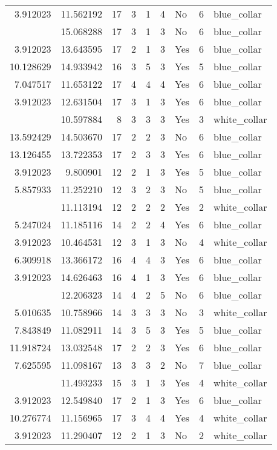 \documentclass[
]{article}
\begin{document}
\begin{longtable}[t]{rrrrrllrl}
3.912023 & 11.562192 & 17 & 3 & 1 & 4 & No & 6 & blue\_collar\\
\addlinespace
3.912023 & 15.068288 & 17 & 3 & 1 & 3 & No & 6 & blue\_collar\\
3.912023 & 13.643595 & 17 & 2 & 1 & 3 & Yes & 6 & blue\_collar\\
10.128629 & 14.933942 & 16 & 3 & 5 & 3 & Yes & 5 & blue\_collar\\
7.047517 & 11.653122 & 17 & 4 & 4 & 4 & Yes & 6 & blue\_collar\\
3.912023 & 12.631504 & 17 & 3 & 1 & 3 & Yes & 6 & blue\_collar\\
\addlinespace
4.605170 & 10.597884 & 8 & 3 & 3 & 3 & Yes & 3 & white\_collar\\
13.592429 & 14.503670 & 17 & 2 & 2 & 3 & No & 6 & blue\_collar\\
13.126455 & 13.722353 & 17 & 2 & 3 & 3 & Yes & 6 & blue\_collar\\
3.912023 & 9.800901 & 12 & 2 & 1 & 3 & Yes & 5 & blue\_collar\\
5.857933 & 11.252210 & 12 & 3 & 2 & 3 & No & 5 & blue\_collar\\
\addlinespace
8.022897 & 11.113194 & 12 & 2 & 2 & 2 & Yes & 2 & white\_collar\\
5.247024 & 11.185116 & 14 & 2 & 2 & 4 & Yes & 6 & blue\_collar\\
3.912023 & 10.464531 & 12 & 3 & 1 & 3 & No & 4 & white\_collar\\
6.309918 & 13.366172 & 16 & 4 & 4 & 3 & Yes & 6 & blue\_collar\\
3.912023 & 14.626463 & 16 & 4 & 1 & 3 & Yes & 6 & blue\_collar\\
\addlinespace
10.128629 & 12.206323 & 14 & 4 & 2 & 5 & No & 6 & blue\_collar\\
5.010635 & 10.758966 & 14 & 3 & 3 & 3 & No & 3 & white\_collar\\
7.843849 & 11.082911 & 14 & 3 & 5 & 3 & Yes & 5 & blue\_collar\\
11.918724 & 13.032548 & 17 & 2 & 2 & 3 & Yes & 6 & blue\_collar\\
7.625595 & 11.098167 & 13 & 3 & 3 & 2 & No & 7 & blue\_collar\\
\addlinespace
3.912023 & 11.493233 & 15 & 3 & 1 & 3 & Yes & 4 & white\_collar\\
3.912023 & 12.549840 & 17 & 2 & 1 & 3 & Yes & 6 & blue\_collar\\
10.276774 & 11.156965 & 17 & 3 & 4 & 4 & Yes & 4 & white\_collar\\
3.912023 & 11.290407 & 12 & 2 & 1 & 3 & No & 2 & white\_collar\\

\end{longtable}
\end{document}

